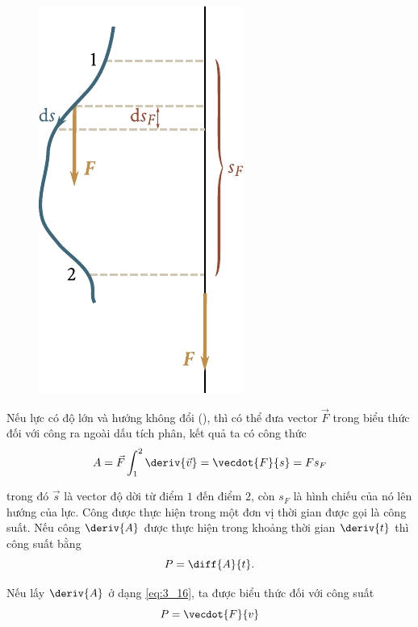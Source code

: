 \begin{figure}[!htb]
	\begin{center}
		\includegraphics[scale=0.95]{figures/ch_03/fig_3_3.pdf}
		\caption[]{}
		\label{fig:3_3}
	\end{center}
\end{figure}

Nếu lực có độ lớn và hướng không đổi (), thì có thể đưa vector $\vec{F}$ trong biểu thức đối với công ra ngoài dấu tích phân, kết quả ta có công thức
\begin{equation}\label{eq:3_19}
A = \vec{F}\int_{1}^{2}\deriv{\vec{v}} = \vecdot{F}{s} = F s_F
\end{equation}

\noindent
trong đó $\vec{s}$ là vector độ dời từ điểm $1$ đến điểm $2$, còn $s_F$ là hình chiếu của nó lên hướng của lực.
Công được thực hiện trong một đơn vị thời gian được gọi là công suất. Nếu công $\deriv{A}$ được thực hiện trong khoảng thời gian $\deriv{t}$ thì công suất bằng
\begin{equation}\label{eq:3_20}
P = \diff{A}{t}.
\end{equation}

\noindent
Nếu lấy $\deriv{A}$ ở dạng \eqref{eq:3_16}, ta được biểu thức đối với công suất 
\begin{equation}\label{eq:3_21}
P = \vecdot{F}{v}
\end{equation}

